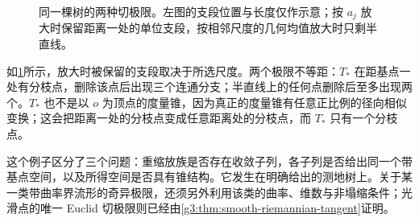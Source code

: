 \begin{figure}[htbp]
	\centering
	
	\caption{同一棵树的两种切极限。左图的支段位置与长度仅作示意；按 \(a_j\) 放大时保留距离一处的单位支段，按相邻尺度的几何均值放大时只剩半直线。}
	\label{g3:fig:tangent-scales}
\end{figure}
如\cref{g3:fig:tangent-scales}所示，放大时被保留的支段取决于所选尺度。两个极限不等距：\(T_*\) 在距基点一处有分枝点，删除该点后出现三个连通分支；半直线上的任何点删除后至多出现两个。\(T_*\) 也不是以 \(o\) 为顶点的度量锥，因为真正的度量锥有任意正比例的径向相似变换；这会把距离一处的分枝点变成任意距离处的分枝点，而 \(T_*\) 只有一个分枝点。

\ProseParagraphBreak

这个例子区分了三个问题：重缩放族是否存在收敛子列，各子列是否给出同一个带基点空间，以及所得空间是否具有锥结构。它发生在明确给出的测地树上。关于某一类带曲率界流形的奇异极限，还须另外利用该类的曲率、维数与非塌缩条件；光滑点的唯一 Euclid 切极限则已经由\cref{g3:thm:smooth-riemannian-tangent}证明。
